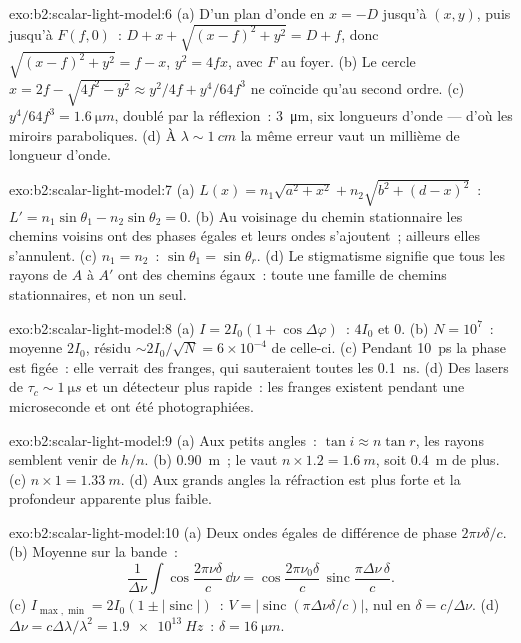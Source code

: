 \begin{solution}{exo:b2:scalar-light-model:6}
(a) D'un plan d'onde en $x = -D$ jusqu'à $(x, y)$, puis jusqu'à $F(f, 0)$~: $D + x
+ \sqrt{(x - f)^2 + y^2} = D + f$, donc $\sqrt{(x - f)^2 + y^2} = f - x$, $y^2 = 4fx$,
avec $F$ au foyer. (b) Le cercle $x = 2f - \sqrt{4f^2 - y^2} \approx y^2/4f +
y^4/64f^3$ ne coïncide qu'au second ordre. (c) $y^4/64f^3 = \qty{1.6}{\micro m}$, doublé
par la réflexion~: \qty{3}{\micro m}, six longueurs d'onde --- d'où les miroirs
paraboliques. (d) À $\lambda \sim \qty{1}{cm}$ la même erreur vaut un millième de
longueur d'onde.
\end{solution}

\begin{solution}{exo:b2:scalar-light-model:7}
(a) $L(x) = n_1\sqrt{a^2 + x^2} + n_2\sqrt{b^2 + (d - x)^2}$~: $L' = n_1\sin\theta_1 -
n_2\sin\theta_2 = 0$. (b) Au voisinage du chemin stationnaire les chemins voisins ont des
phases égales et leurs ondes s'ajoutent~; ailleurs elles s'annulent. (c) $n_1 = n_2$~:
$\sin\theta_1 = \sin\theta_r$. (d) Le stigmatisme signifie que tous les rayons de $A$ à $A'$ ont des
chemins égaux~: toute une famille de chemins stationnaires, et non un seul.
\end{solution}

\begin{solution}{exo:b2:scalar-light-model:8}
(a) $I = 2I_0(1 + \cos\Delta\varphi)$~: $4I_0$ et $0$. (b) $N = 10^7$~: moyenne $2I_0$, résidu
$\sim 2I_0/\sqrt N = 6 \times 10^{-4}$ de celle-ci. (c) Pendant \qty{10}{ps} la phase est
figée~: elle verrait des franges, qui sauteraient toutes les \qty{0.1}{ns}. (d) Des lasers de
$\tau_c \sim \qty{1}{\micro s}$ et un détecteur plus rapide~: les franges existent
pendant une microseconde et ont été photographiées.
\end{solution}

\begin{solution}{exo:b2:scalar-light-model:9}
(a) Aux petits angles~: $\tan i \approx n\tan r$, les rayons semblent venir de $h/n$.
(b) \qty{0.90}{m}~; le  vaut $n \times 1.2 = \qty{1.6}{m}$, soit \qty{0.4}{m} de plus.
(c) $n \times 1 = \qty{1.33}{m}$. (d) Aux grands angles la réfraction est plus forte
et la profondeur apparente plus faible.
\end{solution}

\begin{solution}{exo:b2:scalar-light-model:10}
(a) Deux ondes égales de différence de phase $2\pi\nu\delta/c$. (b) Moyenne
sur la bande~:
\[
\frac1{\Delta\nu}\int\cos\frac{2\pi\nu\delta}c\,\dd\nu = \cos\frac{2\pi\nu_0\delta}c\,\operatorname{sinc}\frac{\pi\Delta\nu\,\delta}c .
\]
(c)
$I_{\max, \min} = 2I_0(1 \pm |\operatorname{sinc}|)$~: $V = |\operatorname{sinc}(\pi\Delta\nu\delta/c)|$,
nul en $\delta = c/\Delta\nu$. (d) $\Delta\nu = c\Delta\lambda/\lambda^2 = \qty{1.9e13}{Hz}$~: $\delta =
\qty{16}{\micro m}$.
\end{solution}

